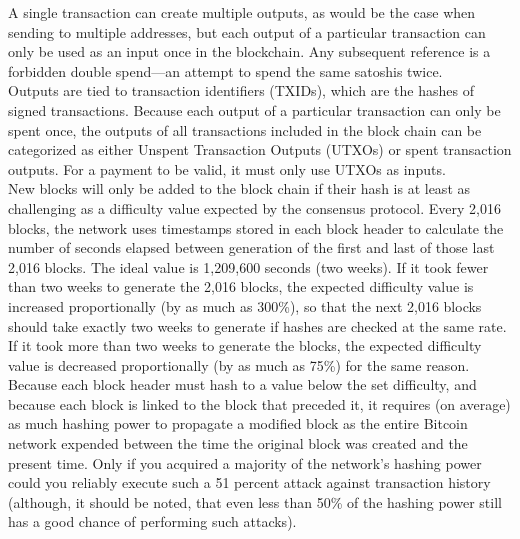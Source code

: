 A single transaction can create multiple outputs, as would be the case when sending to multiple addresses, but each output of a particular transaction can only be used as an input once in the blockchain. Any subsequent reference is a forbidden double spend—an attempt to spend the same satoshis twice.
\newpage
{} 
\\   
Outputs are tied to transaction identifiers (TXIDs), which are the hashes of signed transactions. Because each output of a particular transaction can only be spent once, the outputs of all transactions included in the block chain can be categorized as either Unspent Transaction Outputs (UTXOs) or spent transaction outputs. For a payment to be valid, it must only use UTXOs as inputs.\\
New blocks will only be added to the block chain if their hash is at least as challenging as a difficulty value expected by the consensus protocol. Every 2,016 blocks, the network uses timestamps stored in each block header to calculate the number of seconds elapsed between generation of the first and last of those last 2,016 blocks. The ideal value is 1,209,600 seconds (two weeks). If it took fewer than two weeks to generate the 2,016 blocks, the expected difficulty value is increased proportionally (by as much as 300\%), so that the next 2,016 blocks should take exactly two weeks to generate if hashes are checked at the same rate. If it took more than two weeks to generate the blocks, the expected difficulty value is decreased proportionally (by as much as 75\%) for the same reason. Because each block header must hash to a value below the set difficulty, and because each block is linked to the block that preceded it, it requires (on average) as much hashing power to propagate a modified block as the entire Bitcoin network expended between the time the original block was created and the present time. Only if you acquired a majority of the network’s hashing power could you reliably execute such a 51 percent attack against transaction history (although, it should be noted, that even less than 50\% of the hashing power still has a good chance of performing such attacks).
\newpage
